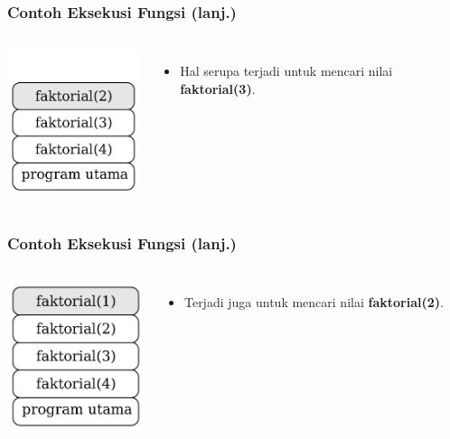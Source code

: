 \begin{frame}
\frametitle{Contoh Eksekusi Fungsi (lanj.)}
\begin{columns}
    \centering
    \includegraphics[width=4cm]{asset/rekursi-4.pdf}
    \begin{itemize}
      \item Hal serupa terjadi untuk mencari nilai \textbf{faktorial(3)}.
    \end{itemize}
  \end{columns} 
\end{frame}

\begin{frame}
\frametitle{Contoh Eksekusi Fungsi (lanj.)}
\begin{columns}
    \centering
    \includegraphics[width=4cm]{asset/rekursi-5.pdf}
    \begin{itemize}
      \item Terjadi juga untuk mencari nilai \textbf{faktorial(2)}.
    \end{itemize}
  \end{columns} 
\end{frame}

